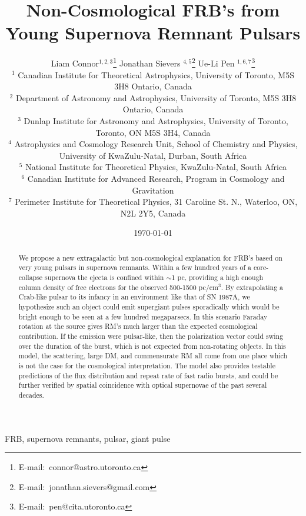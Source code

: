 \documentclass[useAMS,usenatbib]{mn2e}
\title{Non-Cosmological FRB's from Young Supernova Remnant Pulsars}
\author[Connor et al.]{
Liam Connor$^{1,2,3}$\thanks{E-mail:\ connor@astro.utoronto.ca}
Jonathan Sievers $^{4, 5}$\thanks{E-mail:\ jonathan.sievers@gmail.com}
Ue-Li Pen $^{1, 6, 7}$\thanks{E-mail:\ pen@cita.utoronto.ca}
\\
$^1$ Canadian Institute for Theoretical Astrophysics, University of Toronto, M5S 3H8 Ontario, Canada
\\
$^2$ Department of Astronomy and Astrophysics, University of Toronto, 
M5S 3H8 Ontario, Canada
\\
$^3$ Dunlap Institute for Astronomy and Astrophysics, University of Toronto,
Toronto, ON M5S 3H4, Canada
\\
$^4$ Astrophysics and Cosmology Research Unit, School of Chemistry and Physics, University of KwaZulu-Natal, Durban, South Africa
\\
$^5$ National Institute for Theoretical Physics, KwaZulu-Natal, South Africa
\\
$^6$ Canadian Institute for Advanced Research, Program in Cosmology
and Gravitation
\\
$^7$ Perimeter Institute for Theoretical Physics, 31 Caroline St. N., Waterloo, ON, N2L 2Y5, Canada
}
\begin{document}
\date{\today}
\pagerange{\pageref{firstpage}--\pageref{lastpage}} 
\maketitle
\label{firstpage}

\begin{abstract}

We  propose a new extragalactic but non-cosmological explanation for FRB's based on
very young pulsars in supernova remnants. Within a few hundred years of a 
core-collapse supernova the ejecta 
is confined within $\sim$1 pc, providing a high enough column density of free electrons 
for the observed 500-1500 pc/cm$^3$. By extrapolating a Crab-like pulsar to 
its infancy in an environment like that of SN 1987A, 
we hypothesize such an object could emit supergiant pulses sporadically which 
would be bright enough to be seen at a few hundred megaparsecs. In this scenario Faraday
rotation at the source gives RM's much larger than the expected
cosmological contribution.  If the emission were pulsar-like, then the polarization  %
vector could swing over the duration of the burst, which is not expected from 
non-rotating objects.
In this model, the scattering,
large DM, and commensurate RM all come from one place 
 which is not the case for the cosmological
interpretation.  The model also provides
testable predictions of the flux distribution and repeat rate of fast radio bursts, and could be further
verified by spatial coincidence with optical supernovae of the past several decades. 
\end{abstract}
\begin{keywords}
FRB, supernova remnants, pulsar, giant pulse
\end{keywords}

\end{document}
